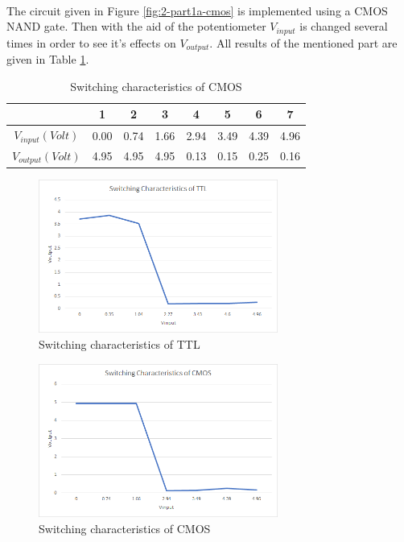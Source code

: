 \documentclass[pdftex,12pt,a4paper]{article}
\begin{document}
\begin{flushleft}
\paragraph{}
The circuit given in Figure \ref{fig:2-part1a-cmos} is implemented using a CMOS NAND gate. Then with the aid of the potentiometer $V_{input}$ is changed several times in order to see it's effects on $V_{output}$. All results of the mentioned part are given in Table \ref{part1a-CMOS}.


\begin{table}[h]
\begin{tabular}{c|c|c|c|c|c|c|c|}
                   & 1    & 2    & 3    & 4    & 5    & 6    & 7    \\ \hline
$V_{input} (Volt)$ & 0.00 & 0.74 & 1.66 & 2.94 & 3.49 & 4.39 & 4.96 \\ \hline
$V_{output}(Volt)$       & 4.95 & 4.95 & 4.95 & 0.13 & 0.15 & 0.25 & 0.16
\end{tabular}
\centering
\caption{Switching characteristics of CMOS}
\label{part1a-CMOS}
\end{table}
\end{flushleft}

\newpage

 \begin{figure}[h]
    	\centering
    	\includegraphics[width=0.7\textwidth]{charts/part1a-chart.png}	
    	\caption{Switching characteristics of TTL}
    	\label{graph:3-part1a-ttl}
\end{figure}

 \begin{figure}[h]
    	\centering
    	\includegraphics[width=0.7\textwidth]{charts/part1a-cmos-chart.png}	
    	\caption{Switching characteristics of CMOS}
    	\label{graph:3-part1a-cmoss}
\end{figure}
\end{document}

